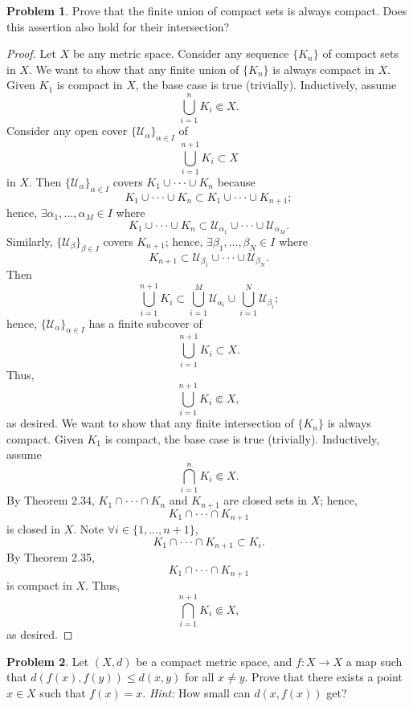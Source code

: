 \documentclass{amsart}
\theoremstyle{definition}
\newtheorem{problem}{Problem}
\begin{document}
\begin{problem}
    Prove that the finite union of compact sets is always compact. Does this assertion also hold for their intersection?
\end{problem}

\begin{proof}
    Let $X$ be any metric space. Consider any sequence $\{K_n\}$ of compact sets in $X$. We want to show that any finite union of $\{K_n\}$ is always compact in $X$. Given $K_1$ is compact in $X$, the base case is true (trivially). Inductively, assume 
    \[
    \bigcup_{i = 1}^{n}K_i \Subset X.
    \]
    Consider any open cover $\{\mathcal{U}_{\alpha}\}_{\alpha \in I}$ of 
    \[
    \bigcup_{i = 1}^{n+1}K_i \subset X
    \]
    in $X$. Then $\{\mathcal{U}_{\alpha}\}_{\alpha \in I}$ covers $K_1 \cup \cdot \cdot \cdot \cup K_{n}$ because
    \[
    K_1 \cup \cdot \cdot \cdot \cup K_{n} \subset K_1 \cup \cdot \cdot \cdot \cup K_{n+1};
    \]
    hence, $\exists \alpha_1,...,\alpha_M \in I$ where
    \[
    K_1 \cup \cdot \cdot \cdot \cup K_n \subset \mathcal{U}_{\alpha_1} \cup \cdot \cdot \cdot \cup \mathcal{U}_{\alpha_M}. 
    \]
    Similarly, $\{\mathcal{U}_{\beta}\}_{\beta \in I}$ covers $K_{n+1}$; hence, $\exists \beta_1,...,\beta_N \in I$ where
    \[
    K_{n+1} \subset \mathcal{U}_{\beta_1} \cup \cdot \cdot \cdot \cup \mathcal{U}_{\beta_N}.
    \]
    Then
    \[
    \bigcup_{i = 1}^{n+1}K_i \subset \bigcup_{i = 1}^{M}\mathcal{U}_{\alpha_i} \cup \bigcup_{i = 1}^{N}\mathcal{U}_{\beta_i};
    \]
    hence, $\{\mathcal{U}_{\alpha}\}_{\alpha \in I}$ has a finite subcover of 
    \[
    \bigcup_{i = 1}^{n+1}K_i \subset X.
    \]
    Thus,
    \[
    \bigcup_{i = 1}^{n+1}K_i \Subset X,
    \]
    as desired. We want to show that any finite intersection of $\{K_n\}$ is always compact. Given $K_1$ is compact, the base case is true (trivially). Inductively, assume 
    \[
    \bigcap_{i = 1}^{n}K_i \Subset X.
    \]
    By Theorem 2.34, $K_1 \cap \cdot \cdot \cdot \cap K_n$ and $K_{n+1}$ are closed sets in $X$; hence, 
    \[
    K_1 \cap \cdot \cdot \cdot \cap K_{n+1}
    \]
    is closed in $X$. Note $\forall i \in \{1,...,n+1\}$,
    \[
    K_1 \cap \cdot \cdot \cdot \cap K_{n+1} \subset K_i. 
    \]
    By Theorem 2.35, 
    \[
    K_1 \cap \cdot \cdot \cdot \cap K_{n+1}
    \]
    is compact in $X$. Thus, 
    \[
    \bigcap_{i = 1}^{n+1}K_i \Subset X,
    \]
    as desired.
    \end{proof}

\begin{problem}
    Let $(X,d)$ be a compact metric space, and $f : X \to X$ a map such that $d(f(x),f(y)) \leq d(x,y)$ for all $x \neq y$. Prove that there exists a point $x \in X$ such that $f(x) = x$. \textit{Hint:} How small can $d(x,f(x))$ get?
\end{problem}
\end{document}
